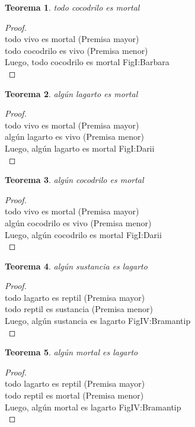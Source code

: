 ﻿\documentclass[12pt]{book}
\newtheorem{theorem}{Teorema}[chapter]
\newtheorem{proof}{Demostración}
\begin{document}
\begin{theorem}
todo cocodrilo es mortal
\label{th: 114}
\end{theorem}\begin{proof}\\todo vivo es mortal	 (Premisa mayor) \\todo cocodrilo es vivo	 (Premisa menor) \\Luego, todo cocodrilo es mortal	FigI:Barbara \\ \end{proof}
\begin{theorem}
algún lagarto es mortal
\label{th: 115}
\end{theorem}\begin{proof}\\todo vivo es mortal	 (Premisa mayor) \\algún lagarto es vivo	 (Premisa menor) \\Luego, algún lagarto es mortal	FigI:Darii \\ \end{proof}
\begin{theorem}
algún cocodrilo es mortal
\label{th: 116}
\end{theorem}\begin{proof}\\todo vivo es mortal	 (Premisa mayor) \\algún cocodrilo es vivo	 (Premisa menor) \\Luego, algún cocodrilo es mortal	FigI:Darii \\ \end{proof}
\begin{theorem}
algún sustancia es lagarto
\label{th: 117}
\end{theorem}\begin{proof}\\todo lagarto es reptil	 (Premisa mayor) \\todo reptil es sustancia	 (Premisa menor) \\Luego, algún sustancia es lagarto	FigIV:Bramantip \\ \end{proof}
\begin{theorem}
algún mortal es lagarto
\label{th: 118}
\end{theorem}\begin{proof}\\todo lagarto es reptil	 (Premisa mayor) \\todo reptil es mortal	 (Premisa menor) \\Luego, algún mortal es lagarto	FigIV:Bramantip \\ \end{proof}
\end{document}
